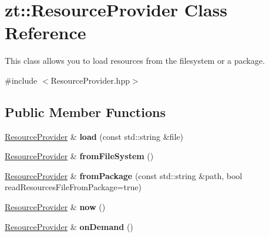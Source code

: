 \hypertarget{classzt_1_1_resource_provider}{}\section{zt\+:\+:Resource\+Provider Class Reference}
\label{classzt_1_1_resource_provider}


This class allows you to load resources from the filesystem or a package.  




{\ttfamily \#include $<$Resource\+Provider.\+hpp$>$}

\subsection*{Public Member Functions}
\begin{DoxyCompactItemize}
\item 
\mbox{\label{classzt_1_1_resource_provider_a377d158f908a51223c9c42f262333ba0}} 
\hyperlink{classzt_1_1_resource_provider}{Resource\+Provider} \& {\bfseries load} (const std\+::string \&file)
\item 
\mbox{\label{classzt_1_1_resource_provider_a4cd1f6c58eef9685bd6ffc761f82168c}} 
\hyperlink{classzt_1_1_resource_provider}{Resource\+Provider} \& {\bfseries from\+File\+System} ()
\item 
\mbox{\label{classzt_1_1_resource_provider_a3f850a07d637c8fc746d5d5d6cd40a5a}} 
\hyperlink{classzt_1_1_resource_provider}{Resource\+Provider} \& {\bfseries from\+Package} (const std\+::string \&path, bool read\+Resources\+File\+From\+Package=true)
\item 
\mbox{\label{classzt_1_1_resource_provider_aa74e82606ac01a1cc1077fac6a7865ea}} 
\hyperlink{classzt_1_1_resource_provider}{Resource\+Provider} \& {\bfseries now} ()
\item 
\mbox{\label{classzt_1_1_resource_provider_ac080a462bf92e2d12a4ad15c90e1c182}} 
\hyperlink{classzt_1_1_resource_provider}{Resource\+Provider} \& {\bfseries on\+Demand} ()
\item 
\mbox{\label{classzt_1_1_resource_provider_aedd409bf8d7bc826d04f8b7750cbd75d}} 

\end{DoxyCompactItemize}

